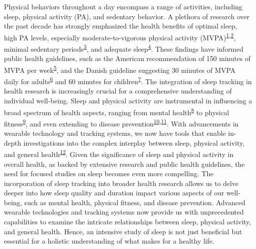 \documentclass[
  9pt,
]{scrbook}
\begin{document}
Physical behaviors throughout a day encompass a range of activities,
including sleep, physical activity (PA), and sedentary behavior. A
plethora of research over the past decade has strongly emphasized the
health benefits of optimal sleep, high PA levels, especially
moderate-to-vigorous physical activity
(MVPA)\textsuperscript{\protect\hyperlink{ref-kraus_physical_2019}{1},\protect\hyperlink{ref-lee_effect_2012}{2}},
minimal sedentary
periods\textsuperscript{\protect\hyperlink{ref-wilmot_sedentary_2012}{3}},
and adequate
sleep\textsuperscript{\protect\hyperlink{ref-cappuccio_sleep_2010}{4}}.
These findings have informed public health guidelines, such as the
American recommendation of 150 minutes of MVPA per
week\textsuperscript{\protect\hyperlink{ref-kl_physical_2018}{5}}, and
the Danish guideline suggesting 30 minutes of MVPA daily for
adults\textsuperscript{\protect\hyperlink{ref-el-zine_fysisk_nodate-1}{6}}
and 60 minutes for
children\textsuperscript{\protect\hyperlink{ref-el-zine_fysisk_nodate}{7}}.
The integration of sleep tracking in health research is increasingly
crucial for a comprehensive understanding of individual well-being.
Sleep and physical activity are instrumental in influencing a broad
spectrum of health aspects, ranging from mental
health\textsuperscript{\protect\hyperlink{ref-biddle_physical_2011}{8}}
to physical
fitness\textsuperscript{\protect\hyperlink{ref-warburton_health_2017}{9}},
and even extending to disease
prevention\textsuperscript{\protect\hyperlink{ref-strath_guide_2013}{10},\protect\hyperlink{ref-arem_leisure_2015}{11}}.
With advancements in wearable technology and tracking systems, we now
have tools that enable in-depth investigations into the complex
interplay between sleep, physical activity, and general
health\textsuperscript{\protect\hyperlink{ref-rollo_whole_2020}{12}}.
Given the significance of sleep and physical activity in overall health,
as backed by extensive research and public health guidelines, the need
for focused studies on sleep becomes even more compelling. The
incorporation of sleep tracking into broader health research allows us
to delve deeper into how sleep quality and duration impact various
aspects of our well-being, such as mental health, physical fitness, and
disease prevention. Advanced wearable technologies and tracking systems
now provide us with unprecedented capabilities to examine the intricate
relationships between sleep, physical activity, and general health.
Hence, an intensive study of sleep is not just beneficial but essential
for a holistic understanding of what makes for a healthy life.
\end{document}
